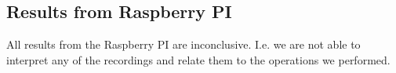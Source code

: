 
\subsection{Results from Raspberry PI}\label{chp5:subsec:rb_bk_results}
All results from the Raspberry PI are inconclusive. 
I.e. we are not able to interpret any of the recordings and relate them to the operations we performed.
